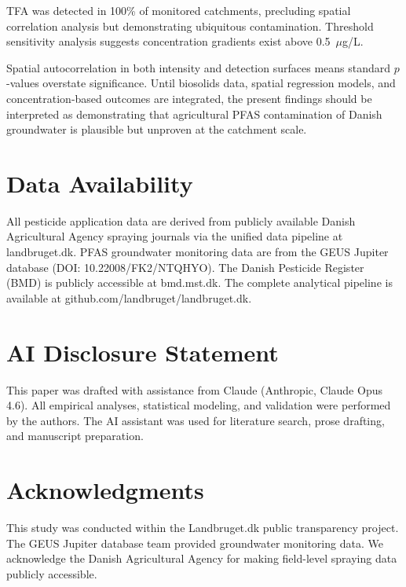 \documentclass[12pt,a4paper]{article}
\begin{document}
TFA was detected in 100\% of monitored catchments, precluding spatial correlation analysis but demonstrating ubiquitous contamination. Threshold sensitivity analysis suggests concentration gradients exist above 0.5~$\mu$g/L.

Spatial autocorrelation in both intensity and detection surfaces means standard $p$-values overstate significance. Until biosolids data, spatial regression models, and concentration-based outcomes are integrated, the present findings should be interpreted as demonstrating that agricultural PFAS contamination of Danish groundwater is plausible but unproven at the catchment scale.

\section*{Data Availability}

All pesticide application data are derived from publicly available Danish Agricultural Agency spraying journals via the unified data pipeline at landbruget.dk. PFAS groundwater monitoring data are from the GEUS Jupiter database (DOI: 10.22008/FK2/NTQHYO). The Danish Pesticide Register (BMD) is publicly accessible at bmd.mst.dk. The complete analytical pipeline is available at github.com/landbruget/landbruget.dk.

\section*{AI Disclosure Statement}

This paper was drafted with assistance from Claude (Anthropic, Claude Opus 4.6). All empirical analyses, statistical modeling, and validation were performed by the authors. The AI assistant was used for literature search, prose drafting, and manuscript preparation.

\section*{Acknowledgments}

This study was conducted within the Landbruget.dk public transparency project. The GEUS Jupiter database team provided groundwater monitoring data. We acknowledge the Danish Agricultural Agency for making field-level spraying data publicly accessible.

\clearpage
\appendix
\renewcommand{\thesection}{S\arabic{section}}
\setcounter{section}{0}
\end{document}
